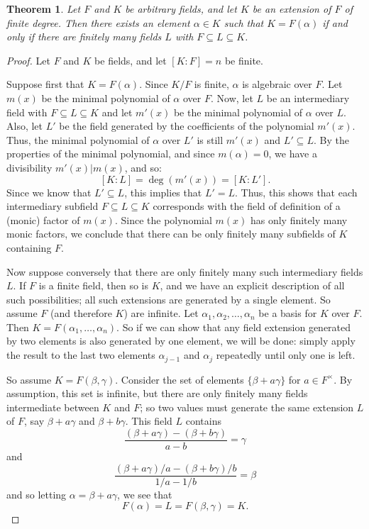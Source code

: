 \documentclass[12pt]{article}
\newtheorem*{theorem}{Theorem}
\begin{document}
\begin{theorem}
Let $F$ and $K$ be arbitrary fields, and let $K$ be an extension of $F$ of finite degree. Then there exists an element $\alpha\in K$ such that $K=F(\alpha)$ if and only if there are finitely many fields $L$ with $F\subseteq L\subseteq K$.
\end{theorem}

\begin{proof}
Let $F$ and $K$ be fields, and let $[K:F]=n$ be finite. 

Suppose first that $K=F(\alpha)$. Since $K/F$ is finite, $\alpha$ is algebraic over $F$. Let $m(x)$ be the minimal polynomial of $\alpha$ over $F$. Now, let $L$ be an intermediary field with $F\subseteq L\subseteq K$ and let $m'(x)$ be the minimal polynomial of $\alpha$ over $L$. Also, let $L'$ be the field generated by the coefficients of the polynomial $m'(x)$. Thus, the minimal polynomial of $\alpha$ over $L'$ is still $m'(x)$ and $L'\subseteq L$. By the properties of the minimal polynomial, and since $m(\alpha)=0$, we have a divisibility $m'(x)|m(x)$, and so:
$$[K:L]=\deg(m'(x))=[K:L'].$$ 
Since we know that $L'\subseteq L$, this implies that $L'=L$. Thus, this shows that each intermediary subfield $F\subseteq L \subseteq K$ corresponds with the field of definition of a (monic) factor of $m(x)$. Since the polynomial $m(x)$ has only finitely many monic factors, we conclude that there can be only finitely many subfields of $K$ containing $F$.


Now suppose conversely that there are only finitely many such intermediary fields $L$.  If $F$ is a finite field, then so is $K$, and we have an explicit description of all such possibilities; all such extensions are generated by a single element.  So assume $F$ (and therefore $K$) are infinite.  Let $\alpha_1, \alpha_2, \ldots, \alpha_n$ be a basis for $K$ over $F$.  Then $K=F(\alpha_1, \ldots, \alpha_n)$.  So if we can show that any field extension generated by two elements is also generated by one element, we will be done: simply apply the result to the last two elements $\alpha_{j-1}$ and $\alpha_j$ repeatedly until only one is left.

So assume $K=F(\beta,\gamma)$.  Consider the set of elements $\{\beta+a\gamma\}$ for $a\in F^{\times}$.  By assumption, this set is infinite, but there are only finitely many fields intermediate between $K$ and $F$; so two values must generate the same extension $L$ of $F$, say $\beta+a\gamma$ and $\beta+b\gamma$.  This field $L$ contains
\[
\frac{(\beta+a\gamma)-(\beta+b\gamma)}{a-b} = \gamma
\] 
and
\[
\frac{(\beta+a\gamma)/a-(\beta+b\gamma)/b}{1/a-1/b} = \beta
\] 
and so letting $\alpha = \beta+a\gamma$, we see that 
\[
F(\alpha)=L=F(\beta,\gamma)=K.
\]
\end{proof}
\end{document}
